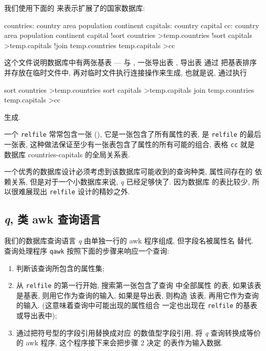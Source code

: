我们使用下面的  来表示扩展了的国家数据库:
\begin{awkcode}
    countries:
        country
        area
        population
        continent
    capitals:
        country
        capital
    cc:
        country
        area
        population
        continent
        capital
        !sort countries >temp.countries
        !sort capitals >temp.capitals
        !join temp.countries temp.capitals >cc
\end{awkcode}
这个文件说明数据库中有两张基表 ---  与
, 一张导出表 , 导出表  通过
把基表排序并存放在临时文件中, 再对临时文件执行连接操作来生成, 也就是说,
 通过执行
\begin{awkcode}
    sort countries >temp.countries
    sort capitals >temp.capitals
    join temp.countries temp.capitals >cc
\end{awkcode}
生成.

一个 \texttt{relfile} 常常包含一张  (), 它是一张包含了所有属性的表, 是 \texttt{relfile} 的最后一张表,
这种做法保证至少有一张表包含了属性的所有可能的组合, 表格 \texttt{cc}
就是 数据库 countries-capitals 的全局关系表.

一个优秀的数据库设计必须考虑到该数据库可能收到的查询种类, 属性间存在的
依赖关系, 但是对于一个小数据库来说, \textit{q} 已经足够快了. 因为数据库
的表比较少, 所以很难展现出 \texttt{relfile} 设计的精妙之外.

\subsection{\textit{q}, 类 awk 查询语言}
\label{subsec:q_an_awk_like_query_language}

我们的数据库查询语言 \textit{q} 由单独一行的 awk 程序组成, 但字段名被属性名
替代. 查询处理程序 \texttt{qawk} 按照下面的步骤来响应一个查询:
\begin{enumerate}
	\item 判断该查询所包含的属性集;
	\item 从 \texttt{relfile} 的第一行开始, 搜索第一张包含了查询
	中全部属性
	的表, 如果该表是基表, 则用它作为查询的输入, 如果是导出表, 则构造
	该表, 再用它作为查询的输入. (这意味着查询中可能出现的属性组合
	一定也出现在 \texttt{relfile} 的基表或导出表中);
	\item 通过把符号型的字段引用替换成对应 的数值型字段引用, 将
	\textit{q} 查询转换成等价的 awk 程序, 这个程序接下来会把步骤 2 决定
	的表作为输入数据.
\end{enumerate}

